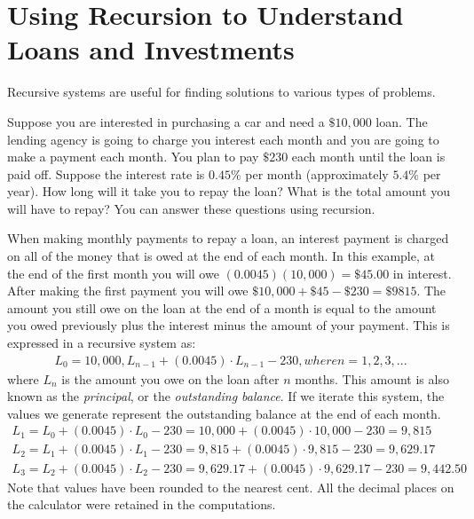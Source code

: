 \documentclass[10pt,]{book}
\theoremstyle{plain}
\theoremstyle{definition}
\theoremstyle{definition}
\theoremstyle{definition}
\numberwithin{equation}{section}
\begin{document}
\section[{Using Recursion to Understand Loans and Investments}]{Using Recursion to Understand Loans and Investments}\label{chapter04-section02}
\hypertarget{p-30}{}%
Recursive systems are useful for finding solutions to various types of problems.%
\par
\hypertarget{p-31}{}%
Suppose you are interested in purchasing a car and need a \(\$10,000\) loan. The lending agency is going to charge you interest each month and you are going to make a payment each month. You plan to pay \(\$230\) each month until the loan is paid off. Suppose the interest rate is \(0.45\%\) per month (approximately \(5.4\%\) per year). How long will it take you to repay the loan? What is the total amount you will have to repay?  You can answer these questions using recursion.%
\par
\hypertarget{p-32}{}%
When making monthly payments to repay a loan, an interest payment is charged on all of the money that is owed at the end of each month.  In this example, at the end of the first month you will owe \((0.0045)(10,000)=\$45.00\) in interest. After making the first payment you will owe \(\$10,000+\$45-\$230=\$9815\). The amount you still owe on the loan at the end of a month is equal to the amount you owed previously plus the interest minus the amount of your payment. This is expressed in a recursive system as:%
%
\begin{gather*}
L_0=10,000, L_{n-1}+(0.0045)\cdot L_{n-1}-230, where n=1,2,3,...
\end{gather*}
\hypertarget{p-33}{}%
where \(L_n\) is the amount you owe on the loan after \(n\) months.  This amount is also known as the \emph{principal}, or the \emph{outstanding balance}. If we iterate this system, the values we generate represent the outstanding balance at the end of each month.%
%
\begin{gather*}
L_1=L_0+(0.0045)\cdot L_0-230=10,000+(0.0045)\cdot 10,000-230=9,815\\
L_2=L_1+(0.0045)\cdot L_1-230=9,815+(0.0045)\cdot 9,815-230=9,629.17\\
L_3=L_2+(0.0045)\cdot L_2-230=9,629.17+(0.0045)\cdot 9,629.17-230=9,442.50
\end{gather*}
\hypertarget{p-34}{}%
Note that values have been rounded to the nearest cent.  All the decimal places on the calculator were retained in the computations.%
\par
\end{document}
